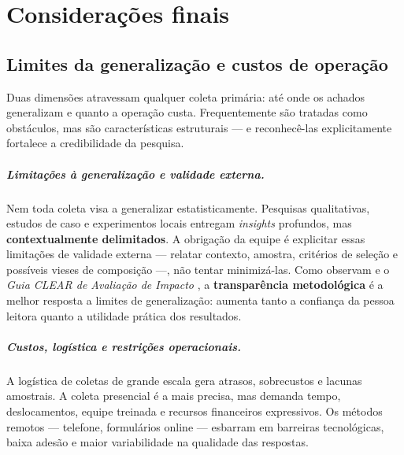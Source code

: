 \documentclass[12pt, a4paper, openany]{book}
\begin{document}
\chapter{Considera\c{c}\~oes finais}

\section{Limites da generaliza\c{c}\~ao e custos de opera\c{c}\~ao}

Duas dimens\~oes atravessam qualquer coleta prim\'aria: at\'e onde os achados generalizam e quanto a opera\c{c}\~ao custa. Frequentemente s\~ao tratadas como obst\'aculos, mas s\~ao caracter\'isticas estruturais --- e reconhec\^e-las explicitamente fortalece a credibilidade da pesquisa.

\paragraph{Limita\c{c}\~oes \`a generaliza\c{c}\~ao e validade externa.} Nem toda coleta visa a generalizar estatisticamente. Pesquisas qualitativas, estudos de caso e experimentos locais entregam \textit{insights} profundos, mas \textbf{contextualmente delimitados}. A obriga\c{c}\~ao da equipe \'e explicitar essas limita\c{c}\~oes de validade externa --- relatar contexto, amostra, crit\'erios de sele\c{c}\~ao e poss\'iveis vieses de composi\c{c}\~ao ---, n\~ao tentar minimiz\'a-las. Como observam \citet{gertler2018impact} e o \textit{Guia CLEAR de Avalia\c{c}\~ao de Impacto} \citep{fgvclear2025ai}, a \textbf{transpar\^encia metodol\'ogica} \'e a melhor resposta a limites de generaliza\c{c}\~ao: aumenta tanto a confian\c{c}a da pessoa leitora quanto a utilidade pr\'atica dos resultados.

\paragraph{Custos, log\'istica e restri\c{c}\~oes operacionais.} A log\'istica de coletas de grande escala gera atrasos, sobrecustos e lacunas amostrais. A coleta presencial \'e a mais precisa, mas demanda tempo, deslocamentos, equipe treinada e recursos financeiros expressivos. Os m\'etodos remotos --- telefone, formul\'arios online --- esbarram em barreiras tecnol\'ogicas, baixa ades\~ao e maior variabilidade na qualidade das respostas.
\end{document}
